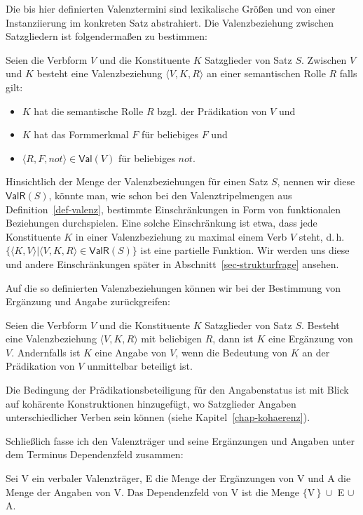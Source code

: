 Die bis hier definierten Valenztermini sind lexikalische Grö\ss en und von einer Instanziierung im konkreten Satz abstrahiert. Die Valenzbeziehung zwischen Satzgliedern ist folgenderma\ss en zu bestimmen:

\begin{definition}[Valenzbeziehung] \label{def:valenzbeziehung}
Seien die Verbform $V$ und die Konstituente $K$ \linebreak Satzglieder von Satz $S$. Zwischen $V$ und $K$ besteht eine Valenzbeziehung $\langle V,K,R \rangle$ an einer semantischen Rolle $R$ falls gilt:
\begin{itemize}
\item $K$ hat die semantische Rolle $R$ bzgl. der Prädikation von $V$  und 
\item $K$ hat das Formmerkmal $F$ für beliebiges $F$ und
\item $\langle R,F,not \rangle \in \mathsf{Val}(V)$ für beliebiges $not$.
\end{itemize}
\end{definition}
Hinsichtlich der Menge der Valenzbeziehungen für einen Satz $S$, nennen wir diese $\mathsf{ValR}(S)$, könnte man, wie schon bei den Valenztripelmengen aus Definition~\ref{def-valenz}, bestimmte Einschränkungen in Form von funktionalen Beziehungen durchspielen. Eine solche Einschränkung ist etwa, dass jede Konstituente $K$ in einer Valenzbeziehung zu maximal einem Verb $V$ steht, d.\,h.\ $\{\langle K,V \rangle | \langle V,K,R \rangle \in \mathsf{ValR}(S) \}$ ist eine partielle Funktion. Wir werden uns diese und andere Einschränkungen später in Abschnitt~\ref{sec-strukturfrage} ansehen. 

Auf die so definierten Valenzbeziehungen können wir bei der Bestimmung von Ergänzung und Angabe zurückgreifen:
\begin{definition}
Seien die Verbform $V$ und die Konstituente $K$ Satzglieder von Satz $S$. Besteht eine Valenzbeziehung $\langle V,K,R\rangle$ mit beliebigen $R$, dann ist $K$ eine Ergänzung von $V$. Andernfalls ist $K$ eine Angabe von $V$, wenn die Bedeutung von $K$ an der Prädikation von $V$ unmittelbar beteiligt ist.
\end{definition}
Die Bedingung der Prädikationsbeteiligung für den Angabenstatus ist mit Blick auf kohärente Konstruktionen hinzugefügt, wo Satzglieder Angaben unterschiedlicher Verben sein können (siehe Kapitel~\ref{chap-kohaerenz}).

Schlie\ss lich fasse ich den Valenzträger und seine Ergänzungen und Angaben unter dem Terminus Dependenzfeld zusammen:
\begin{definition}[Dependenzfeld] \label{def-dependenzfeld}
Sei V ein verbaler Valenzträger, E die Menge der Ergänzungen von V und A die Menge der Angaben von V. Das Dependenzfeld von V ist die Menge $\{$V\,$\} \ \cup$ E $\cup$ A.
\end{definition}




